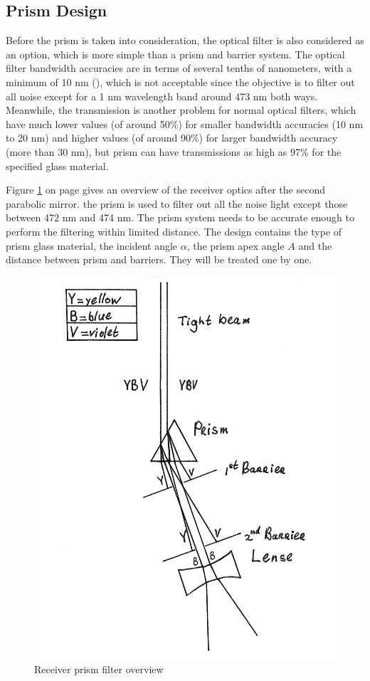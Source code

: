 \subsection{Prism Design}
\label{prism}
Before the prism is taken into consideration, the optical filter is also considered as an option, which is more simple than a prism and barrier system. The optical filter bandwidth accuracies are in terms of several tenths of nanometers, with a minimum of 10 nm (\cite{optical_filter}), which is not acceptable since the objective is to filter out all noise except for a 1 nm wavelength band around 473 nm both ways. Meanwhile, the transmission is another problem for normal optical filters, which have much lower values (of around 50\%) for smaller bandwidth accuracies (10 nm to 20 nm) and higher values (of around 90\%) for larger bandwidth accuracy (more than 30 nm), but prism can have transmissions as high as 97\% for the specified glass material.

Figure \ref{fig:prism} on page \pageref{fig:prism} gives an overview of the receiver optics after the second parabolic mirror. the prism is used to filter out all the noise light except those between 472 nm and 474 nm. The prism system needs to be accurate enough to perform the filtering within limited distance. The design contains the type of prism glass material, the incident angle $\alpha$, the prism apex angle $A$ and the distance between prism and barriers. They will be treated one by one.

\begin{figure}[ht!]
\centering
\includegraphics[scale = 0.6]{chapters/img/Prism.png}
\caption{Receiver prism filter overview}
\label{fig:prism}
\end{figure} 


